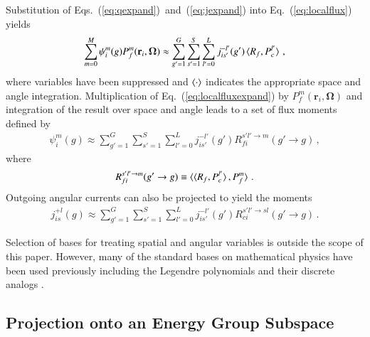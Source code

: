 \documentclass[5p,times,twocolumn,10pt]{elsarticle}
\newcommand{\EQ}[1]{Eq.~(\ref{#1})}               %
\newcommand{\EQSTWO}[2]{Eqs.~(\ref{#1})~and~(\ref{#2})}
\begin{document}
    Substitution of \EQSTWO{eq:qexpand}{eq:jexpand} into \EQ{eq:localflux}
    yields
    \begin{equation}
        \begin{split}
            \sum^M_{m=0} \psi_{i}^m(g) P^m_f(\mathbf{r}_i,\bm{\Omega})
            \approx
            \sum^{G}_{g'=1}  \sum^{S}_{s'=1} \sum_{l'=0}^L  j^{-l'}_{is'}(g')
            \braket{ R_{f}, P^{l'}_c }    \, ,
        \end{split}
        \label{eq:localfluxexpand}
    \end{equation}
    where variables have been suppressed and $\braket{\cdot}$ indicates the
    appropriate space and angle integration. Multiplication of
    \EQ{eq:localfluxexpand} by $P^{m}_{f}(\mathbf{r}_i, \bm{\Omega})$
    and integration of the result over space and angle leads to a set of
    flux moments defined by
    \begin{equation}
        \begin{split}
            \psi^{m}_{i}(g) \approx
            \sum^{G}_{g'=1} \sum^{S}_{s'=1} \sum_{l'=0}^L
            j^{-l'}_{is'}(g') R^{s'l' \to m}_{fi}(g'\rightarrow g)  \, ,
        \end{split}
        \label{eq:fluxmoments}
    \end{equation}
    where
    \begin{equation}
        R^{s'l' \to m}_{fi}(g'\rightarrow g) \equiv
        \braket{ \braket{ R_{f}, P^{l'}_c}, P^{m}_f} \, .
    \end{equation}
    Outgoing angular currents can also be projected to yield the moments
    \begin{equation}
        \begin{split}
            j^{+l}_{is}(g) \approx
            \sum^{G}_{g'=1} \sum^{S}_{s'=1} \sum_{l'=0}^L
            j^{-l'}_{is'}(g') R^{s'l' \to sl}_{ci}(g'\rightarrow g)  \, .
        \end{split}
        \label{eq:jmoments}
    \end{equation}

    Selection of bases for treating spatial and angular variables is outside
    the scope of this paper.  However, many of the standard bases on
    mathematical physics have been used previously including the Legendre
    polynomials and their discrete analogs \cite{RobertsSerment}.

    \subsection{Projection onto an Energy Group Subspace}
\end{document}
